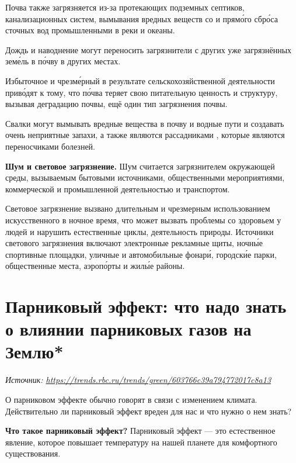 Почва также загрязняется из-за протекающих подземных септиков, канализационных систем, вымывания вредных веществ со  и прям\'{о}го сбр\'{о}са сточных вод промышленными  в реки и океаны.

Дождь и наводнение могут переносить загрязнители с других уже загрязнённых зем\'{е}ль в п\'{о}чву в других местах.

Избыточное  и чрезм\'{е}рный  в результате сельскохозяйственной деятельности прив\'{о}дят к тому, что п\'{о}чва теряет свою питательную ценность и структуру, вызывая деградацию почвы, ещё один тип загрязнения почвы.

Свалки могут вымывать вредные вещества в почву и водные пути и создавать очень неприятные запахи, а также являются рассадниками , которые являются переносчиками болезней.

\textbf{Шум и световое загрязнение.}
Шум считается загрязнителем окружающей среды, вызываемым бытовыми источниками, общественными мероприятиями, коммерческой и промышленной деятельностью и транспортом.

Световое загрязнение вызвано длительным и чрезмерным использованием искусственного  в ночное время, что может вызвать проблемы со здоровьем у людей и нарушить естественные циклы,  деятельность  природы. Источники светового загрязнения включают электронные рекламные щиты, ночн\'{ы}е спортивные площадки, уличные и автомобильные фонар\'{и}, городск\'{и}е парки, общественные места, аэроп\'{о}рты и жил\'{ы}е районы.

\newpage
\section[Парниковый эффект]{Парниковый эффект: что надо знать о влиянии парниковых газов на Землю*}

\textit{Источник: \url{https://trends.rbc.ru/trends/green/603766c39a794772017c8a13}}

О парниковом эффекте обычно говорят в связи с изменением климата. Действительно ли парниковый эффект вреден для нас и что нужно о нем знать?

\textbf{Что такое парниковый эффект?}
Парниковый эффект — это естественное явление, которое повышает температуру на нашей планете для комфортного существования.

